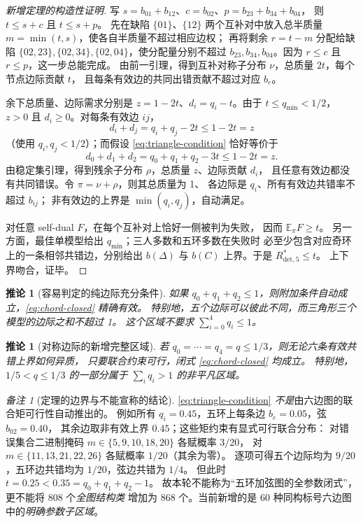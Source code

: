\documentclass[11pt,a4paper]{ctexart}
\newtheorem{corollary}[theorem]{推论}
\theoremstyle{remark}\newtheorem{remark}[theorem]{备注}
\newcommand{\Rstar}{R^*_{\mathrm{det},5}}
\begin{document}
\begin{proof}[新增定理的构造性证明]
写 $s=b_{01}+b_{12}$、$c=b_{02}$、$p=b_{23}+b_{34}+b_{04}$，
则 $t\le s+c$ 且 $t\le s+p$。
先在缺陷 $\{01\}$、$\{12\}$ 两个互补对中放入总半质量
$m=\min(t,s)$，使各自半质量不超过相应边权；
再将剩余 $r=t-m$ 分配给缺陷
$\{02,23\},\{02,34\},\{02,04\}$，使分配量分别不超过
$b_{23},b_{34},b_{04}$。因为
$r\le c$ 且 $r\le p$，这一步总能完成。
由前一引理，得到互补对称子分布 $\nu$，总质量 $2t$，每个节点边际贡献 $t$，
且每条有效边的共同出错贡献不超过对应 $b_e$。

余下总质量、边际需求分别是
$z=1-2t$、$d_i=q_i-t$。由于 $t\le q_{\min}<1/2$，
$z>0$ 且 $d_i\ge0$。对每条有效边 $ij$，
\[
 d_i+d_j=q_i+q_j-2t\le1-2t=z
\]
（使用 $q_i,q_j<1/2$）；而假设 \eqref{eq:triangle-condition} 恰好等价于
\[
 d_0+d_1+d_2= q_0+q_1+q_2-3t\le 1-2t=z.
\]
由稳定集引理，得到残余子分布 $\rho$，总质量 $z$、边际贡献 $d_i$，
且任意有效边都没有共同错误。令 $\pi=\nu+\rho$，则其总质量为 1、
各边际是 $q_i$、所有有效边共错率不超过 $b_{ij}$；
非有效边的上界是 $\min(q_i,q_j)$，自动满足。

对任意 self-dual $F$，在每个互补对上恰好一侧被判为失败，
因而 $\mathbb E_\pi F\ge t$。
另一方面，最佳单模型给出 $q_{\min}$；三人多数和五环多数在失败时
必至少包含对应奇环上的一条相邻共错边，分别给出
$b(\Delta)$ 与 $b(C)$ 上界。于是 $\Rstar\le t$。
上下界吻合，证毕。
\end{proof}

\begin{corollary}[容易判定的纯边际充分条件]
如果 $q_0+q_1+q_2\le1$，则附加条件自动成立，\eqref{eq:chord-closed} 精确有效。
特别地，五个边际可以彼此不同，而三角形三个模型的边际之和不超过 1。
这个区域不要求 $\sum_{i=0}^4q_i\le1$。
\end{corollary}
\begin{corollary}[对称边际的新增完整区域]
若 $q_0=\cdots=q_4=q\le1/3$，则无论六条有效共错上界如何异质，
只要联合约束可行，闭式 \eqref{eq:chord-closed} 均成立。
特别地，$1/5<q\le1/3$ 的一部分属于 $\sum_iq_i>1$ 的非平凡区域。
\end{corollary}

\begin{remark}[定理的边界与不能宣称的结论]
\eqref{eq:triangle-condition} \emph{不是}由六边图的联合矩可行性自动推出的。
例如所有 $q_i=0.45$，五环上每条边 $b_e=0.05$，弦 $b_{02}=0.40$，
其余边取非有效上界 $0.45$；这些矩约束有显式可行联合分布：
对错误集合二进制掩码 $m\in\{5,9,10,18,20\}$ 各赋概率 $3/20$，
对 $m\in\{11,13,21,22,26\}$ 各赋概率 $1/20$（其余为零）。
逐项可得五个边际均为 $9/20$，五环边共错均为 $1/20$，弦边共错为 $1/4$。
但此时 $t=0.25<0.35=q_0+q_1+q_2-1$。
故本轮不能称为“五环加弦图的全参数闭式”，更不能将 808 个\emph{全图结构类}
增加为 868 个。当前新增的是 60 种同构标号六边图中的\emph{明确参数子区域}。
\end{remark}
\end{document}
